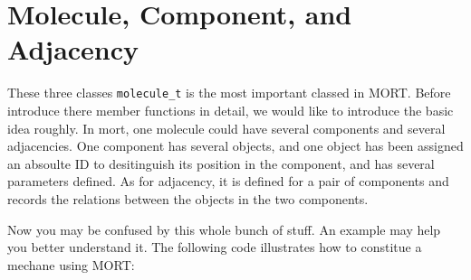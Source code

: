\documentclass[letterpaper]{book}
\begin{document}
\section{Molecule, Component, and Adjacency}
  These three classes \lstinline$molecule_t$ is the most important classed in MORT. 
Before introduce there member functions in detail, we would like to introduce the basic idea roughly.
In mort, one molecule could have several components and several adjacencies. One component has several 
objects, and one object has been assigned an absoulte ID to desitinguish its position in the component, 
and has several parameters defined. As for adjacency, it is defined for a pair of components and records 
the relations between the objects in the two components.

  Now you may be confused by this whole bunch of stuff. An example may help you better understand
it. The following code illustrates how to constitue a mechane using MORT:
\end{document}

